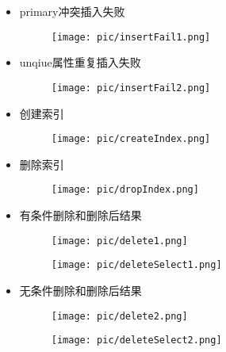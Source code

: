\documentclass[10pt]{article}
\begin{document}
\begin{CJK}{UTF8}{gkai}
\begin{itemize}
\begin{figure}[H]
		\end{figure}
		\item primary冲突插入失败
		\begin{figure}[H]
			\begin{center}
				\texttt{[image: pic/insertFail1.png]}
			\end{center}
		\end{figure}
		\item unqiue属性重复插入失败
		\begin{figure}[H]
			\begin{center}
				\texttt{[image: pic/insertFail2.png]}
			\end{center}
		\end{figure}
		\item 创建索引
		\begin{figure}[H]
			\begin{center}
				\texttt{[image: pic/createIndex.png]}
			\end{center}
		\end{figure}
		\item 删除索引
		\begin{figure}[H]
			\begin{center}
				\texttt{[image: pic/dropIndex.png]}
			\end{center}
		\end{figure}
		\item 有条件删除和删除后结果
		\begin{figure}[H]
			\begin{center}
				\texttt{[image: pic/delete1.png]}
			\end{center}
		\end{figure}
		\begin{figure}[H]
			\begin{center}
				\texttt{[image: pic/deleteSelect1.png]}
			\end{center}
		\end{figure}
		\item 无条件删除和删除后结果
		\begin{figure}[H]
			\begin{center}
				\texttt{[image: pic/delete2.png]}
			\end{center}
		\end{figure}
		\begin{figure}[H]
			\begin{center}
				\texttt{[image: pic/deleteSelect2.png]}

\end{center}
\end{figure}
\end{itemize}
\end{CJK}
\end{document}
